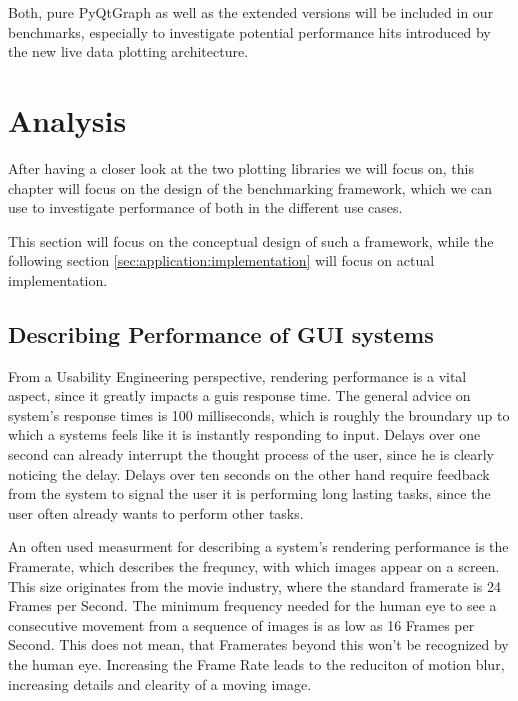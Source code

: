 Both, pure PyQtGraph as well as the extended versions will be included in our
benchmarks, especially to investigate potential performance hits introduced by
the new live data plotting architecture.




\section{Analysis} \label{sec:application:analysis}

After having a closer look at the two plotting libraries we will focus on, this
chapter will focus on the design of the benchmarking framework, which we can use
to investigate performance of both in the different use cases.

This section will focus on the conceptual design of such a framework, while the
following section \ref{sec:application:implementation} will focus on actual
implementation.

\subsection{Describing Performance of GUI systems}
\label{sec:application:analysis:performance}

From a Usability Engineering perspective, rendering performance is a vital
aspect, since it greatly impacts a \glspl{gui} response time. The general advice
on system's response times is 100 milliseconds, which is roughly the broundary
up to which a systems feels like it is instantly responding to input. Delays
over one second can already interrupt the thought process of the user, since he
is clearly noticing the delay. Delays over ten seconds on the other hand require
feedback from the system to signal the user it is performing long lasting tasks,
since the user often already wants to perform other tasks.


An often used measurment for describing a system's rendering performance is the
Framerate, which describes the frequncy, with which images appear on a screen.
This size originates from the movie industry, where the standard framerate is 24
Frames per Second. The minimum frequency needed for the human eye to see a
consecutive movement from a sequence of images is as low as 16 Frames per
Second. This does not mean, that Framerates beyond this won't be recognized by
the human eye. Increasing the Frame Rate leads to the reduciton of motion blur,
increasing details and clearity of a moving image.

